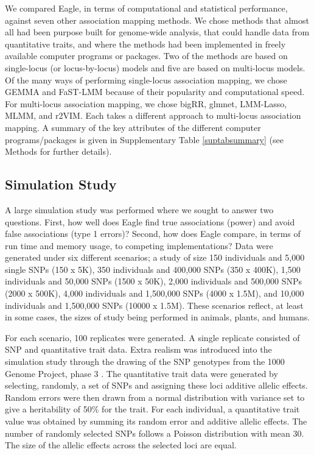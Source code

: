 \documentclass{article}
\begin{document}
We compared Eagle, in terms of computational and statistical performance, against seven other association mapping methods. 
We chose methods that almost all had been purpose built for genome-wide analysis, that could handle data from quantitative traits, and where the methods had been implemented in freely available computer programs or packages. Two of the methods are based on single-locus (or locus-by-locus) models and five are based on multi-locus models. Of the many ways of performing single-locus association mapping, we chose 
GEMMA and FaST-LMM  because of their popularity and computational speed. 
For multi-locus association mapping, we chose bigRR, glmnet, 
LMM-Lasso, MLMM, and r2VIM.  
Each takes a different approach to multi-locus association mapping. A summary of the key attributes of the different computer programs/packages 
is given in Supplementary Table \ref{suptabsummary} (see Methods for further details). 

 

\subsection{Simulation Study}
A large simulation study was performed where we sought to  answer two questions. 
First, how well does Eagle find true associations (power) and avoid 
false associations (type 1 errors)? Second, how does Eagle compare, in terms of run time and memory usage, to 
competing implementations? Data were generated under six different scenarios; a study of size 150 individuals 
and 5,000 single SNPs (150 x 5K),  350 individuals and 400,000 SNPs (350 x 400K),  1,500 individuals and 
50,000 SNPs (1500 x 50K), 2,000 individuals and 500,000 SNPs (2000 x 500K), 4,000 individuals and 
1,500,000 SNPs (4000 x 1.5M), and 10,000 individuals and 1,500,000 SNPs (10000 x 1.5M).   
These scenarios reflect, at least in some cases, the sizes of study being performed in animals, plants, and humans.  

For each scenario, 100 replicates were generated. A single replicate consisted of SNP and quantitative trait data. 
Extra realism was introduced into the simulation study through the drawing of the SNP genotypes from the 1000 Genome Project, phase 3  \citep{10002010map}.
 The quantitative trait data were generated 
by selecting, randomly, a set of SNPs and assigning these loci additive allelic effects.  Random errors were then drawn from a normal distribution 
with variance set to give a heritability of 50\% for the trait. 
For each individual, a quantitative trait value was obtained by summing its random error and additive allelic effects. 
The number of randomly selected SNPs follows a Poisson distribution with mean 30. The size of the allelic effects 
 across the selected loci are equal.  
 
\end{document}
